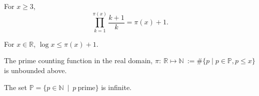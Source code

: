 \begin{lemma}
\label{lem:lemma5}
\leanok
For $x\ge3$,
    $$\prod_{k=1}^{\pi(x)}\frac{k+1}{k} = \pi(x)+1.$$
\end{lemma}

\begin{theorem}
\label{thm:log_le_primeCountingReal_add_one}
\leanok
For $x\in\mathbb{R}$, $\log x \le \pi(x) +1$.
\end{theorem}

\begin{theorem}
\label{thm:primeCountingReal_unbounded}
\leanok
The prime counting function in the real domain, $\pi:\ \mathbb{R} \mapsto \mathbb{N} \ := \#\big\{p\mid p \in\mathbb{P}, p\le x \big\}$ is unbounded above.
\end{theorem}

\begin{theorem}
\label{thm:infinite_primes}
\leanok
{}
The set $\mathbb{P} = \big\{p \in \mathbb{N} \ \mid \ p \ \mathrm{prime} \big\}$ is infinite. 
\end{theorem}

